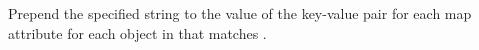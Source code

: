 Prepend the specified string to the value of the key-value pair for each map
attribute for each object in  that matches .


